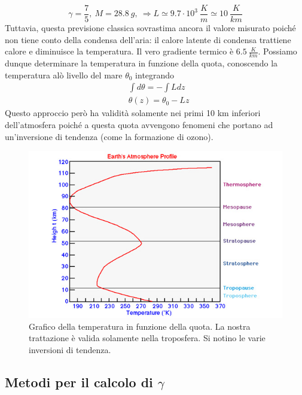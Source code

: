 \documentclass[
10pt, %
a4paper, %
oneside, %
headinclude,footinclude, %
BCOR5mm, %
]{scrartcl}
\begin{document}
\[\gamma = \frac{7}{5},\ M = 28.8\ g,\ \Rightarrow L \simeq 9.7\cdot 10^3\ \frac{K}{m} \simeq 10\ \frac{K}{km}\]
Tuttavia, questa previsione classica sovrastima ancora il valore misurato poiché non tiene conto della condensa dell'aria: il calore latente di condensa trattiene calore e diminuisce la temperatura. Il vero gradiente termico è $6.5\ \frac{K}{km}$. Possiamo dunque determinare la temperatura in funzione della quota, conoscendo la temperatura alò livello del mare $\theta_0$ integrando 
\begin{align*}
	&\int d\theta = -\int L dz\\
	&\theta (z) = \theta_0 - L z
\end{align*}
Questo approccio però ha validità solamente nei primi 10 km inferiori dell'atmosfera poiché a questa quota avvengono fenomeni che portano ad un'inversione di tendenza (come la formazione di ozono). 
\begin{figure}[h!]
	\centering
	\includegraphics[width=0.6\linewidth]{"../images/temperatura atmosferica"}
	\caption{Grafico della temperatura in funzione della quota. La nostra trattazione è valida solamente nella troposfera. Si notino le varie inversioni di tendenza.}
	\label{fig:temperatura-atmosferica}
\end{figure}
\FloatBarrier
\subsection{Metodi per il calcolo di $\gamma$}
\end{document}
